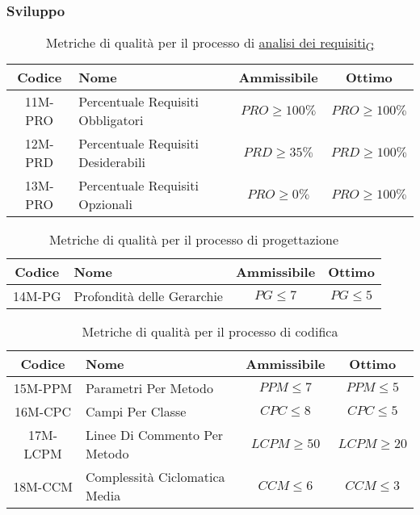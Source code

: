 \newpage
\subsubsection{Sviluppo}
\begin{table}[h!]
	\centering
	\begin{tabular}{ | c | l | c | c | }
		\hline
		Codice   & Nome                               & Ammissibile      & Ottimo           \\
		\hline
		11M-PRO  & Percentuale Requisiti Obbligatori  & $PRO \geq 100\%$ & $PRO \geq 100\%$ \\
		12M-PRD  & Percentuale Requisiti Desiderabili & $PRD \geq 35\%$  & $PRD \geq 100\%$ \\
		13M-PRO  & Percentuale Requisiti Opzionali    & $PRO \geq 0\%$   & $PRO \geq 100\%$ \\
		\hline
	\end{tabular}
	\caption{Metriche di qualità per il processo di \href{https://7last.github.io/docs/rtb/documentazione-interna/glossario\#analisi-dei-requisiti}{analisi dei requisiti\textsubscript{G}}}
\end{table}

\begin{table}[h!]
	\centering
	\begin{tabular}{ | c | l | c | c | }
		\hline
		Codice   & Nome                       & Ammissibile & Ottimo           \\
		\hline
		14M-PG   & Profondità delle Gerarchie & $PG \leq 7$ & $PG \leq 5$      \\
		\hline
	\end{tabular}
	\caption{Metriche di qualità per il processo di progettazione}
\end{table}

\begin{table}[h!]
	\centering
	\begin{tabular}{ | c | l | c | c | }
		\hline
		Codice   & Nome                          & Ammissibile    & Ottimo         \\
		\hline
		15M-PPM  & Parametri Per Metodo          & $PPM \leq 7$   & $PPM \leq 5$   \\
		16M-CPC  & Campi Per Classe 	         & $CPC \leq 8$   & $CPC \leq 5$   \\
		17M-LCPM & Linee Di Commento Per Metodo  & $LCPM \geq 50$ & $LCPM \geq 20$ \\
		18M-CCM  & Complessità Ciclomatica Media & $CCM \leq 6$   & $CCM \leq 3$   \\
		\hline
	\end{tabular}
	\caption{Metriche di qualità per il processo di codifica}
\end{table}

